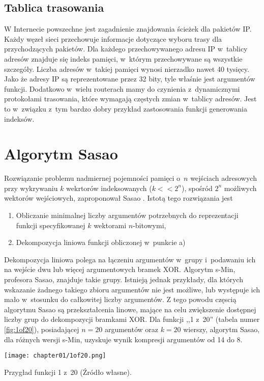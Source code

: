 \subsection{Tablica trasowania}
W Internecie powszechne jest zagadnienie znajdowania ścieżek dla pakietów IP.
Każdy węzeł sieci przechowuje informacje dotyczące wyboru trasy dla przychodzących pakietów.
Dla każdego przechowywanego adresu IP w~tablicy adresów znajduje się indeks pamięci, w~którym przechowywane są wszystkie szczegóły.
Liczba adresów w~takiej pamięci wynosi nierzadko nawet 40 tysięcy.
Jako że adresy IP są reprezentowane przez 32 bity, tyle właśnie jest argumentów funkcji.
Dodatkowo w~wielu routerach mamy do czynienia z~dynamicznymi protokołami trasowania, które wymagają częstych zmian w~tablicy adresów.
Jest to w~związku z~tym bardzo dobry przykład zastosowania funkcji generowania indeksów.


\section{Algorytm Sasao}
Rozwiązanie problemu nadmiernej pojemności pamięci o~$n$ wejściach adresowych przy wykrywaniu $k$ wekrtorów indeksowanych ($k<<2^n$),
spośród $2^n$ możliwych wektorów wejściowych,
zaproponował Sasao \cite{sasao-workshop, sasao-recent, sasao-s-min, sasao-synthesis}.
Istotą tego rozwiązania jest
\begin{enumerate}[label=\alph*)]
\item Obliczanie minimalnej liczby argumentów potrzebnych do reprezentacji funkcji specyfikowanej $k$ wektorami $n$-bitowymi,
\item Dekompozycja liniowa funkcji obliczonej w~punkcie a)
\end{enumerate}

Dekompozycja liniowa polega na łączeniu argumentów w~grupy i~podawaniu ich na wejście dwu lub więcej argumentowych bramek XOR.
Algorytm s-Min, profesora Sasao, znajduje takie grupy.
Istnieją jednak przykłady,
dla których wskazanie żadnego takiego zbioru argumentów nie jest możliwe,
lub występuje ich mało w~stosunku do całkowitej liczby argumentów.
Z tego powodu częscią algorytmu Sasao są przekształcenia linowe,
mające na celu zwiększenie dostępnej liczby grup do dekompozycji bramkami XOR.
Dla funkcji ,,1 z~20'' (tabela numer \ref{fig:1of20}),
posiadającej $n=20$ argumentów oraz $k=20$ wierszy,
algorytm Sasao,
dla różnych wersji s-Min,
uzyskuje wynik kompresji argumentów od 14 do 8.

\begin{table}
\centering
\texttt{[image: chapter01/1of20.png]}
\caption{Przygład funkcji 1 z~20 (Źródło własne).}
\label{fig:1of20}
\end{table}

